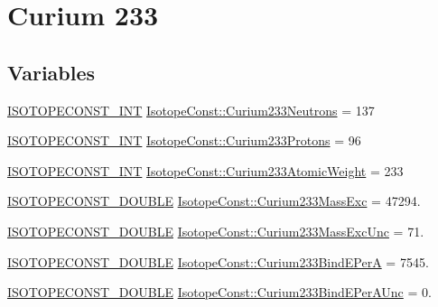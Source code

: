 \hypertarget{group___isotope_const-_curium-_cm233}{}\section{Curium 233}
\label{group___isotope_const-_curium-_cm233}
\subsection*{Variables}
\begin{DoxyCompactItemize}
\item 
\mbox{\hyperlink{group___isotope_const-_macros_ga5f18360b3e99483a35c32d789e62621c}{I\+S\+O\+T\+O\+P\+E\+C\+O\+N\+S\+T\+\_\+\+I\+NT}} \mbox{\hyperlink{group___isotope_const-_curium-_cm233_ga299a20093708f3a0f8e8a275eead65e9}{Isotope\+Const\+::\+Curium233\+Neutrons}} = 137
\item 
\mbox{\hyperlink{group___isotope_const-_macros_ga5f18360b3e99483a35c32d789e62621c}{I\+S\+O\+T\+O\+P\+E\+C\+O\+N\+S\+T\+\_\+\+I\+NT}} \mbox{\hyperlink{group___isotope_const-_curium-_cm233_gaef973dea5c999bd8c6c96300e0dde23b}{Isotope\+Const\+::\+Curium233\+Protons}} = 96
\item 
\mbox{\hyperlink{group___isotope_const-_macros_ga5f18360b3e99483a35c32d789e62621c}{I\+S\+O\+T\+O\+P\+E\+C\+O\+N\+S\+T\+\_\+\+I\+NT}} \mbox{\hyperlink{group___isotope_const-_curium-_cm233_ga86e624a63806a4e380d030419d3c6867}{Isotope\+Const\+::\+Curium233\+Atomic\+Weight}} = 233
\item 
\mbox{\hyperlink{group___isotope_const-_macros_ga8f45a7272ce02c0b4c65c44636ed719a}{I\+S\+O\+T\+O\+P\+E\+C\+O\+N\+S\+T\+\_\+\+D\+O\+U\+B\+LE}} \mbox{\hyperlink{group___isotope_const-_curium-_cm233_ga6e2e16de229fbfa22b0a8568c1115daf}{Isotope\+Const\+::\+Curium233\+Mass\+Exc}} = 47294.
\item 
\mbox{\hyperlink{group___isotope_const-_macros_ga8f45a7272ce02c0b4c65c44636ed719a}{I\+S\+O\+T\+O\+P\+E\+C\+O\+N\+S\+T\+\_\+\+D\+O\+U\+B\+LE}} \mbox{\hyperlink{group___isotope_const-_curium-_cm233_ga32cb51c9f6caf2288ff489016aeae8d7}{Isotope\+Const\+::\+Curium233\+Mass\+Exc\+Unc}} = 71.
\item 
\mbox{\hyperlink{group___isotope_const-_macros_ga8f45a7272ce02c0b4c65c44636ed719a}{I\+S\+O\+T\+O\+P\+E\+C\+O\+N\+S\+T\+\_\+\+D\+O\+U\+B\+LE}} \mbox{\hyperlink{group___isotope_const-_curium-_cm233_gacb67ccc5b07d4ccac10a9cd78273636a}{Isotope\+Const\+::\+Curium233\+Bind\+E\+PerA}} = 7545.
\item 
\mbox{\hyperlink{group___isotope_const-_macros_ga8f45a7272ce02c0b4c65c44636ed719a}{I\+S\+O\+T\+O\+P\+E\+C\+O\+N\+S\+T\+\_\+\+D\+O\+U\+B\+LE}} \mbox{\hyperlink{group___isotope_const-_curium-_cm233_gafa2f08a352a2790e69e4e25a5be02df6}{Isotope\+Const\+::\+Curium233\+Bind\+E\+Per\+A\+Unc}} = 0.

\end{DoxyCompactItemize}
